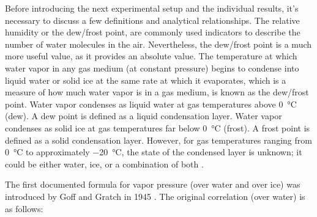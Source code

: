 Before introducing the next experimental setup and the individual results, it's necessary to discuss a few definitions and analytical relationships. The relative humidity or the dew/frost point, are commonly used indicators to describe the number of water molecules in the air. Nevertheless, the dew/frost point is a much more useful value, as it provides an absolute value. The temperature at which water vapor in any gas medium (at constant pressure) begins to condense into liquid water or solid ice at the same rate at which it evaporates, which is a measure of how much water vapor is in a gas medium, is known as the dew/frost point. Water vapor condenses as liquid water at gas temperatures above \SI{0}{\celsius} (dew). A dew point is defined as a liquid condensation layer. Water vapor condenses as solid ice at gas temperatures far below \SI{0}{\celsius} (frost). A frost point is defined as a solid condensation layer. However, for gas temperatures ranging from \SI{0}{\celsius} to approximately \SI{-20}{\celsius}, the state of the condensed layer is unknown; it could be either water, ice, or a combination of both \cite{nie_dewpoint}. 


The first documented formula for vapor pressure (over water and over ice) was introduced by Goff and Gratch in 1945 \cite{goff_gratch}. The original correlation (over water) is as follows:

